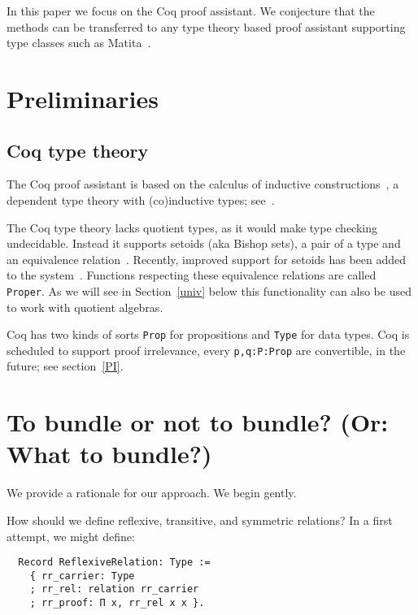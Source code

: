 \documentclass[a4paper,10pt,runningheads]{llncs}
\begin{document}
In this paper we focus on the Coq proof assistant. We conjecture that the methods can be transferred
to any type theory based proof assistant supporting type classes such as
Matita~\cite{asperti2007user}.

\section{Preliminaries}
\subsection{Coq type theory}
The Coq proof assistant is based on the calculus of inductive
constructions~\cite{CoquandHuet,CoquandPaulin}, a dependent type theory with (co)inductive types; see~\cite{Coq,BC04}.

The Coq type theory lacks quotient
types, as it would make type checking undecidable. Instead it supports setoids (aka Bishop sets), a pair of a type and an equivalence relation~\cite{Bishop67,Hofmann,Capretta}. Recently, improved support for setoids has been added to the system~\cite{Setoid-rewrite}. Functions respecting these equivalence relations are called \lstinline|Proper|.
As we will see in Section~\ref{univ} below this functionality can also be used to work with
quotient algebras.

Coq has two kinds of sorts \lstinline|Prop| for propositions and \lstinline|Type| for data types. Coq
is scheduled to support proof irrelevance, every \lstinline|p,q:P:Prop| are
convertible, in the future; see section~\ref{PI}.


\section{To bundle or not to bundle? (Or: What to bundle?)}\label{bundle}
We provide a rationale for our approach. We begin gently.

How should we define reflexive, transitive, and symmetric relations? In a first attempt, we might define:
\begin{lstlisting}
  Record ReflexiveRelation: Type :=
    { rr_carrier: Type
    ; rr_rel: relation rr_carrier
    ; rr_proof: Π x, rr_rel x x }.
\end{lstlisting}
 
\end{document}
